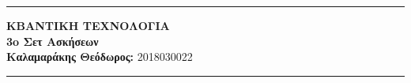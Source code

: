 \documentclass[12pt]{article}
\begin{document}
\greektext

\noindent\rule{\textwidth}{2pt}
\begin{center}
{\bf ΚΒΑΝΤΙΚΗ ΤΕΧΝΟΛΟΓΙΑ}\\ 
{\bf 3o Σετ Ασκήσεων }\\
{\bf Καλαμαράκης Θεόδωρος:} 2018030022\\
\end{center}
\rule{\textwidth}{.5pt}
\noindent

\begin{center}

\end{center}
 
 

\justifying

\end{document}
